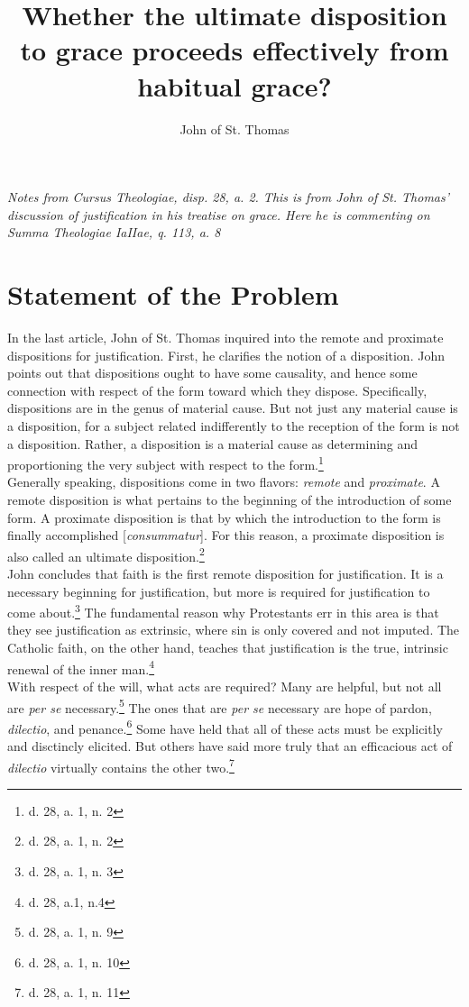 \documentclass[11pt]{memoir}
\title{Whether the ultimate disposition to grace proceeds effectively from habitual grace?}
\author{John of St. Thomas}
\date{}
\begin{document}
\maketitle

\noindent \emph{Notes from \emph{Cursus Theologiae}, disp. 28, a. 2. This is from John of St. Thomas' discussion of justification
in his treatise on grace. Here he is commenting on \emph{Summa Theologiae} IaIIae, q. 113, a. 8}

\section*{Statement of the Problem}

In the last article, John of St. Thomas inquired into the remote and proximate dispositions for justification. First, he
clarifies the notion of a disposition. John points out that dispositions ought to have some causality, and hence some
connection with respect of the form toward which they dispose. Specifically, dispositions
are in the genus of material cause. But not just any material cause is a disposition, for a subject related
indifferently to the reception of the form is not a disposition. Rather, a disposition is a material cause as
determining and proportioning the very subject with respect to the form.\footnote{d. 28, a. 1, n. 2} \\

\noindent Generally speaking, dispositions come in two flavors: \emph{remote} and \emph{proximate}. A remote disposition is what
pertains to the beginning of the introduction of some form. A proximate disposition is that by which the introduction to
the form is finally accomplished [\emph{consummatur}]. For this reason, a proximate disposition is also called an
ultimate disposition.\footnote{d. 28, a. 1, n. 2} \\

\noindent John concludes that faith is the first remote disposition for justification. It is a necessary beginning for
justification, but more is required for justification to come about.\footnote{d. 28, a. 1, n. 3} The fundamental reason
why Protestants err in this area is that they see justification as extrinsic, where sin is only covered and not imputed.
The Catholic faith, on the other hand, teaches that justification is the true, intrinsic renewal of the inner
man.\footnote{d. 28, a.1, n.4} \\

\noindent With respect of the will, what acts are required? Many are helpful, but not all are \emph{per se}
necessary.\footnote{d. 28, a. 1, n. 9} The ones
that are \emph{per se} necessary are hope of pardon, \emph{dilectio}, and penance.\footnote{d. 28, a. 1, n. 10} Some
have held that all of these acts must be explicitly and disctincly elicited. But others have said more truly that an
efficacious act of \emph{dilectio} virtually contains the other two.\footnote{d. 28, a. 1, n. 11} \\
\end{document}
